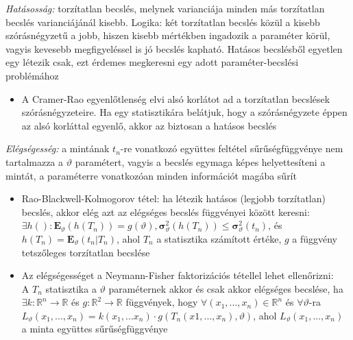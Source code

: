 \emph{Hatásosság:} torzítatlan becslés, melynek varianciája minden más torzítatlan becslés varianciájánál kisebb. Logika: két torzítatlan becslés közül a kisebb szórásnégyzetű a jobb, hiszen kisebb mértékben ingadozik a paraméter körül, vagyis kevesebb megfigyeléssel is jó becslés kapható. Hatásos becslésből egyetlen egy létezik csak, ezt érdemes megkeresni egy adott paraméter-becslési problémához
\begin{itemize}
\item A Cramer-Rao egyenlőtlenség elvi alsó korlátot ad a torzítatlan becslések szórásnégyzeteire. Ha egy statisztikára belátjuk, hogy a szórásnégyzete éppen az alsó korláttal egyenlő, akkor az biztosan a hatásos becslés
\end{itemize}

\emph{Elégségesség:} a mintának $t_n$-re vonatkozó együttes feltétel sűrűségfüggvénye nem tartalmazza a $\vartheta$ paramétert, vagyis a becslés egymaga képes helyettesíteni a mintát, a paraméterre vonatkozóan minden információt magába sűrít
	\begin{itemize}
	\item Rao-Blackwell-Kolmogorov tétel: ha létezik hatásos (legjobb torzítatlan) becslés, akkor elég azt az elégséges becslés függvényei között keresni:\\
	$\exists h(): \mathbf{E}_\vartheta(h(T_n)) = g(\vartheta), \mathbf{\sigma}^2_\vartheta(h(T_n)) \leq \mathbf{\sigma}^2_\vartheta(t_n)$, és $h(T_n) = \mathbf{E}_\vartheta(t_n | T_n)$, ahol $T_n$ a statisztika számított értéke, $g$ a függvény tetszőleges torzítatlan becslése
	\item Az elégségességet a Neymann-Fisher faktorizációs tétellel lehet ellenőrizni:\\
	A $T_n$ statisztika a $\vartheta$ paraméternek akkor és csak akkor elégséges becslése, ha $\exists k : \mathbb{R}^n \rightarrow \mathbb{R}$ és $g:\mathbb{R}^2 \rightarrow \mathbb{R}$ függvények, hogy $\forall (x_1,...,x_n) \in \mathbb{R}^n$ és $\forall \vartheta$-ra\\ $L_\vartheta(x_1,...,x_n)=k(x_1,...x_n) \cdot g(T_n(x1,...,x_n),\vartheta)$, ahol $L_\vartheta(x_1,...,x_n)$ a minta együttes sűrűségfüggvénye
	\end{itemize}

